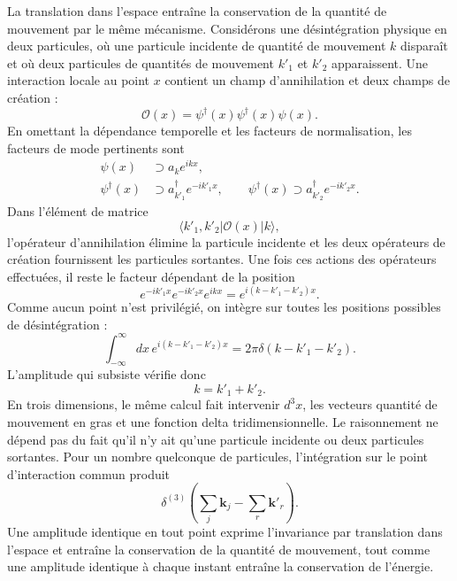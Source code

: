 La translation dans l’espace entraîne la conservation de la quantité de mouvement par le même mécanisme. Considérons une désintégration physique en deux particules, où une particule incidente de quantité de mouvement \(k\) disparaît et où deux particules de quantités de mouvement \(k'_1\) et \(k'_2\) apparaissent. Une interaction locale au point \(x\) contient un champ d’annihilation et deux champs de création :
\begin{equation}
\mathcal{O}(x)=\psi^\dagger(x)\psi^\dagger(x)\psi(x).
\end{equation}
En omettant la dépendance temporelle et les facteurs de normalisation, les facteurs de mode pertinents sont
\begin{align}
\psi(x)&\supset a_k e^{ikx},
\\
\psi^\dagger(x)&\supset a_{k'_1}^\dagger e^{-ik'_1x},
\qquad
\psi^\dagger(x)\supset a_{k'_2}^\dagger e^{-ik'_2x}.
\end{align}
Dans l’élément de matrice
\begin{equation}
\langle k'_1,k'_2|\mathcal{O}(x)|k\rangle,
\end{equation}
l’opérateur d’annihilation élimine la particule incidente et les deux opérateurs de création fournissent les particules sortantes. Une fois ces actions des opérateurs effectuées, il reste le facteur dépendant de la position
\begin{equation}
e^{-ik'_1x}e^{-ik'_2x}e^{ikx}
=e^{i(k-k'_1-k'_2)x}.
\end{equation}
Comme aucun point n’est privilégié, on intègre sur toutes les positions possibles de désintégration :
\begin{equation}
\int_{-\infty}^{\infty}dx\,
e^{i(k-k'_1-k'_2)x}
=2\pi\delta(k-k'_1-k'_2).
\end{equation}
L’amplitude qui subsiste vérifie donc
\begin{equation}
k=k'_1+k'_2.
\end{equation}
En trois dimensions, le même calcul fait intervenir \(d^3x\), les vecteurs quantité de mouvement en gras et une fonction delta tridimensionnelle. Le raisonnement ne dépend pas du fait qu’il n’y ait qu’une particule incidente ou deux particules sortantes. Pour un nombre quelconque de particules, l’intégration sur le point d’interaction commun produit
\begin{equation}
\delta^{(3)}\!\left(
\sum_j\mathbf{k}_j-\sum_r\mathbf{k}'_r
\right).
\end{equation}
Une amplitude identique en tout point exprime l’invariance par translation dans l’espace et entraîne la conservation de la quantité de mouvement, tout comme une amplitude identique à chaque instant entraîne la conservation de l’énergie.

